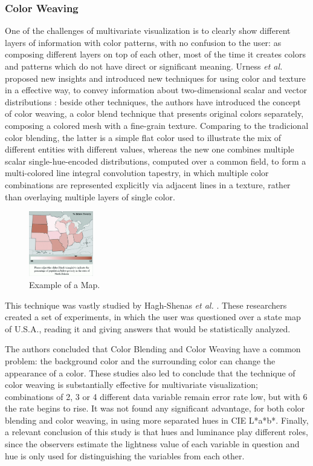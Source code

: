\subsubsection{Color Weaving}
%
One of the challenges of multivariate visualization
is to clearly show different layers of information with color patterns, with no confusion to the user: as
composing different layers on top of each other, most of the time it creates colors and patterns which
do not have direct or significant meaning. Urness \emph{et al.} proposed new insights and introduced new
techniques for using color and texture in a effective way, to convey information about two-dimensional
scalar and vector distributions \cite{Urness2003}: beside other techniques, the authors have introduced the concept
of color weaving, a color blend technique that presents original colors separately, composing a colored
mesh with a fine-grain texture. Comparing to the tradicional color blending, the latter is a simple flat
color used to illustrate the mix of different entities with different values, whereas the new one
combines multiple scalar single-hue-encoded distributions, computed over a common field, to form a
multi-colored line integral convolution tapestry, in which multiple color combinations are represented
explicitly via adjacent lines in a texture, rather than overlaying multiple layers of single color. \par
%
\begin{figure}
	\centering
    \includegraphics[width=0.25\textwidth]{images/background/WeavingTest1.png}
    \caption[Color Weaving - First Study]{Example of a Map.
    \protect\cite{Hagh-Shenas2007}}
    \label{fig:weaving2}
\end{figure}
%
This technique was vastly studied by Hagh-Shenas \emph{et al.} \cite{Hagh-Shenas2007}. These researchers created a
set of experiments, in which the user was questioned over a state map of U.S.A., reading it and giving answers
that would be statistically analyzed. \par
%
The authors concluded that Color Blending and Color Weaving have a common problem: the background color and the
surrounding color can change the appearance of a color. These studies also led to conclude that the technique
of color weaving is substantially effective for multivariate visualization; combinations of 2, 3 or 4 different
data variable remain error rate low, but with 6 the rate begins to rise. It was not found any significant advantage,
for both color blending and color weaving, in using more separated hues in CIE L*a*b*. Finally, a relevant conclusion of
this study is that hues and luminance play different roles, since the observers estimate the lightness
value of each variable in question and hue is only used for distinguishing the variables from each other.
%
